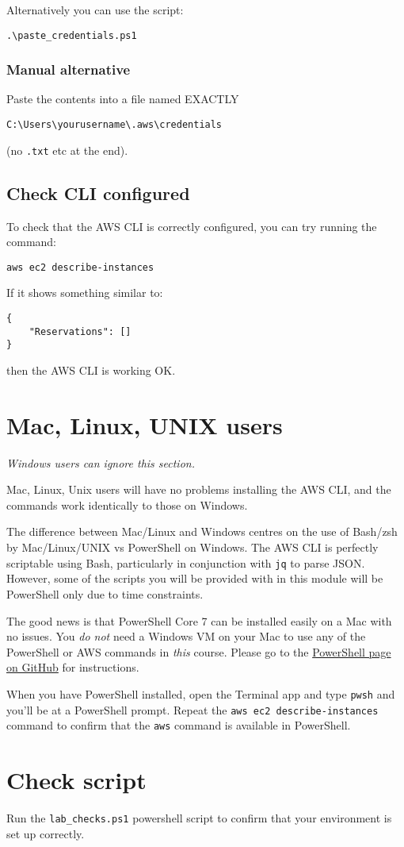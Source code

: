 \documentclass{pgnotes}
\begin{document}
Alternatively you can use the script:
\begin{verbatim}
.\paste_credentials.ps1
\end{verbatim}


\subsubsection{Manual alternative}

Paste the contents into a file named EXACTLY 
\begin{verbatim}
C:\Users\yourusername\.aws\credentials
\end{verbatim}
(no \texttt{.txt} etc at the end). 

\subsection{Check CLI configured}

To check that the AWS CLI is correctly configured, you can try running the command:
\begin{verbatim}
aws ec2 describe-instances
\end{verbatim}
If it shows something similar to:
\begin{verbatim}
{
    "Reservations": []
}
\end{verbatim}
then the AWS CLI is working OK.

\section{Mac, Linux, UNIX users}

\textit{Windows users can ignore this section.}

Mac, Linux, Unix users will have no problems installing the AWS CLI, and the commands work identically to those on Windows.

The difference between Mac/Linux and Windows centres on the use of Bash/zsh by Mac/Linux/UNIX vs PowerShell on Windows.
The AWS CLI is perfectly scriptable using Bash, particularly in conjunction with \texttt{jq} to parse JSON.
However, some of the scripts you will be provided with in this module will be PowerShell only due to time constraints.

The good news is that PowerShell Core 7 can be installed easily on a Mac with no issues.
You \textit{do not} need a Windows VM on your Mac to use any of the PowerShell or AWS commands in \textit{this} course.
Please go to the \href{https://github.com/PowerShell/PowerShell}{PowerShell page on GitHub} for instructions.

When you have PowerShell installed, open the Terminal app and type \texttt{pwsh} and you'll be at a PowerShell prompt.
Repeat the \texttt{aws ec2 describe-instances} command to confirm that the \texttt{aws} command is available in PowerShell. 

\section{Check script}

Run the \texttt{lab\_checks.ps1} powershell script to confirm that your environment is set up correctly. 
\end{document}
